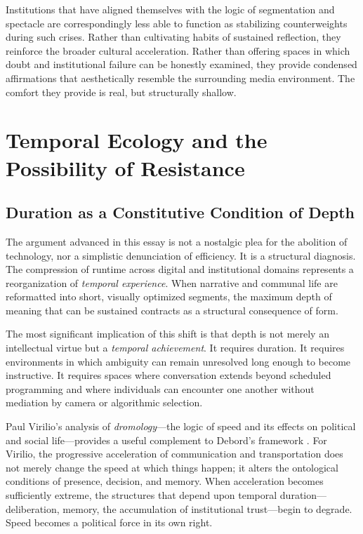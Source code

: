 \documentclass[12pt]{article}
\begin{document}
Institutions that have aligned themselves with the logic of segmentation and spectacle are correspondingly less able to function as stabilizing counterweights during such crises. Rather than cultivating habits of sustained reflection, they reinforce the broader cultural acceleration. Rather than offering spaces in which doubt and institutional failure can be honestly examined, they provide condensed affirmations that aesthetically resemble the surrounding media environment. The comfort they provide is real, but structurally shallow.

\section{Temporal Ecology and the Possibility of Resistance}
\label{sec:ecology}

\subsection{Duration as a Constitutive Condition of Depth}

The argument advanced in this essay is not a nostalgic plea for the abolition of technology, nor a simplistic denunciation of efficiency. It is a structural diagnosis. The compression of runtime across digital and institutional domains represents a reorganization of \emph{temporal experience}. When narrative and communal life are reformatted into short, visually optimized segments, the maximum depth of meaning that can be sustained contracts as a structural consequence of form.

The most significant implication of this shift is that depth is not merely an intellectual virtue but a \emph{temporal achievement}. It requires duration. It requires environments in which ambiguity can remain unresolved long enough to become instructive. It requires spaces where conversation extends beyond scheduled programming and where individuals can encounter one another without mediation by camera or algorithmic selection.

Paul Virilio's analysis of \emph{dromology}---the logic of speed and its effects on political and social life---provides a useful complement to Debord's framework \citep{Virilio1986}. For Virilio, the progressive acceleration of communication and transportation does not merely change the speed at which things happen; it alters the ontological conditions of presence, decision, and memory. When acceleration becomes sufficiently extreme, the structures that depend upon temporal duration---deliberation, memory, the accumulation of institutional trust---begin to degrade. Speed becomes a political force in its own right.
\end{document}
